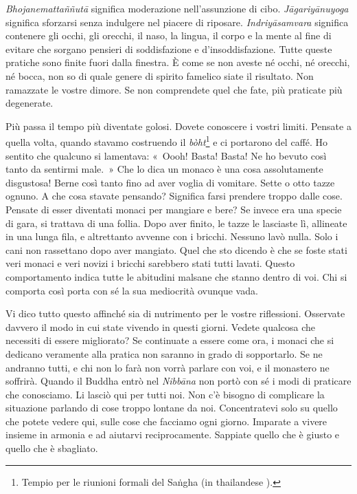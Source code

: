 \emph{Bhojanemattaññutā} significa moderazione nell'assunzione di cibo.
\emph{Jāgariyānuyoga} significa sforzarsi senza indulgere nel piacere di
riposare. \emph{Indriyāsamvara} significa contenere gli occhi, gli
orecchi, il naso, la lingua, il corpo e la mente al fine di evitare che
sorgano pensieri di soddisfazione e d'insoddisfazione. Tutte queste
pratiche sono finite fuori dalla finestra. È come se non aveste né
occhi, né orecchi, né bocca, non so di quale genere di spirito famelico
siate il risultato. Non ramazzate le vostre dimore. Se non comprendete
quel che fate, più praticate più degenerate.

Più passa il tempo più diventate golosi. Dovete conoscere i vostri
limiti. Pensate a quella volta, quando stavamo costruendo il
\emph{bòht}\footnote{Tempio per le riunioni formali del Saṅgha (in
  thailandese ).} e ci portarono del caffé. Ho sentito che qualcuno
si lamentava: «~Oooh! Basta! Basta! Ne ho bevuto così tanto da sentirmi
male.~» Che lo dica un monaco è una cosa assolutamente disgustosa! Berne
così tanto fino ad aver voglia di vomitare. Sette o otto tazze ognuno. A
che cosa stavate pensando? Significa farsi prendere troppo dalle cose.
Pensate di esser diventati monaci per mangiare e bere? Se invece era una
specie di gara, si trattava di una follia. Dopo aver finito, le tazze le
lasciaste lì, allineate in una lunga fila, e altrettanto avvenne con i
bricchi. Nessuno lavò nulla. Solo i cani non rassettano dopo aver
mangiato. Quel che sto dicendo è che se foste stati veri monaci e veri
novizi i bricchi sarebbero stati tutti lavati. Questo comportamento
indica tutte le abitudini malsane che stanno dentro di voi. Chi si
comporta così porta con sé la sua mediocrità ovunque vada.

Vi dico tutto questo affinché sia di nutrimento per le vostre
riflessioni. Osservate davvero il modo in cui state vivendo in questi
giorni. Vedete qualcosa che necessiti di essere migliorato? Se
continuate a essere come ora, i monaci che si dedicano veramente alla
pratica non saranno in grado di sopportarlo. Se ne andranno tutti, e chi
non lo farà non vorrà parlare con voi, e il monastero ne soffrirà.
Quando il Buddha entrò nel \emph{Nibbāna} non portò con sé i modi di
praticare che conosciamo. Li lasciò qui per tutti noi. Non c'è bisogno
di complicare la situazione parlando di cose troppo lontane da noi.
Concentratevi solo su quello che potete vedere qui, sulle cose che
facciamo ogni giorno. Imparate a vivere insieme in armonia e ad aiutarvi
reciprocamente. Sappiate quello che è giusto e quello che è sbagliato.

